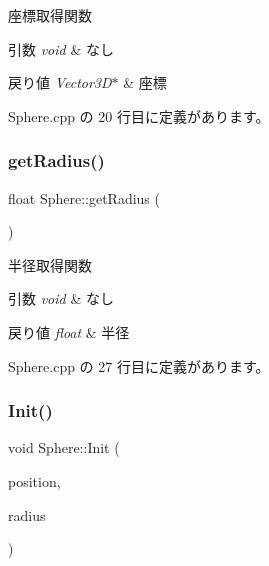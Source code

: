 座標取得関数 


\begin{DoxyParams}{引数}
{\em void} & なし \\
\hline
\end{DoxyParams}

\begin{DoxyRetVals}{戻り値}
{\em Vector3\+D$\ast$} & 座標 \\
\hline
\end{DoxyRetVals}


 Sphere.\+cpp の 20 行目に定義があります。

\mbox{\label{class_sphere_a330dd34c7c7b6dfff106c4c71ec80028}} 
\subsubsection{\texorpdfstring{get\+Radius()}{getRadius()}}
{\footnotesize\ttfamily float Sphere\+::get\+Radius (\begin{DoxyParamCaption}{ }\end{DoxyParamCaption})}



半径取得関数 


\begin{DoxyParams}{引数}
{\em void} & なし \\
\hline
\end{DoxyParams}

\begin{DoxyRetVals}{戻り値}
{\em float} & 半径 \\
\hline
\end{DoxyRetVals}


 Sphere.\+cpp の 27 行目に定義があります。

\mbox{\label{class_sphere_aa0c93894c5dad170bd65f1cec3493c37}} 
\subsubsection{\texorpdfstring{Init()}{Init()}}
{\footnotesize\ttfamily void Sphere\+::\+Init (\begin{DoxyParamCaption}\item[{\mbox{\hyperlink{class_vector3_d}{Vector3D}}}]{position,  }\item[{float}]{radius }\end{DoxyParamCaption})}




